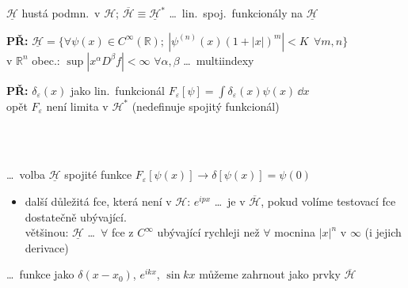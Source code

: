 \begin{definice}
$\underline{\mathcal{H}}$ hustá podmn.\ v $\mathcal{H}$; \quad $\overline{\mathcal{H}} \equiv \underline{\mathcal{H}}^*$ \dots\ lin.\ spoj.\ funkcionály na $\underline{\mathcal{H}}$
\end{definice}

\textbf{PŘ:} \quad $\underline{\mathcal{H}} = \big\{\forall\psi(x)\in C^\infty(\mathbb{R});\ |\psi^{(n)}(x)(1+|x|)^m| < K\ \ \forall m,n\big\}$ \quad {} \\
\quad v $\mathbb{R}^n$ obec.: $\sup|x^\alpha D^\beta f| < \infty$ $\forall\alpha,\beta$ \dots\ multiindexy

\textbf{PŘ:} \quad $\delta_\varepsilon(x)$ jako lin.\ funkcionál \quad $F_\varepsilon[\psi] = \int\delta_\varepsilon(x)\psi(x)\,\dd x$ \\
\quad opět $F_\varepsilon$ není limita v $\mathcal{H}^*$ \quad (nedefinuje spojitý funkcionál)

\begin{minipage}{0.65\textwidth}
 \\
 \\
\end{minipage}
\begin{minipage}{0.33\textwidth}
\end{minipage}

\dots\ volba $\underline{\mathcal{H}}$ spojité funkce \quad $F_\varepsilon[\psi(x)] \to \delta[\psi(x)] = \psi(0)$

\begin{itemize}
  \item další důležitá fce, která není v $\mathcal{H}$: \quad $e^{ipx}$ \dots\ je v $\overline{\mathcal{H}}$, pokud volíme testovací fce dostatečně ubývající. \\
        většinou: \quad $\underline{\mathcal{H}}$ \dots\ $\forall$ fce z $C^\infty$ ubývající rychleji než $\forall$ mocnina $|x|^n$ v $\infty$ (i jejich derivace)
\end{itemize}
\dots\ funkce jako $\delta(x - x_0)$, $e^{ikx}$, $\sin kx$ můžeme zahrnout jako prvky $\overline{\mathcal{H}}$

